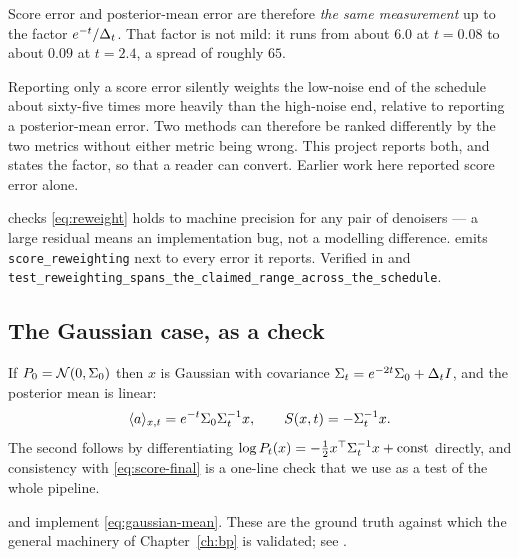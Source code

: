 Score error and posterior-mean error are therefore \emph{the same measurement} up to the
factor $e^{-t}/\Delta_t$. That factor is not mild: it runs from about $6.0$ at $t=0.08$ to about
$0.09$ at $t=2.4$, a spread of roughly $65$.

\begin{pitfall}
Reporting only a score error silently weights the low-noise end of the schedule about
sixty-five times more heavily than the high-noise end, relative to reporting a posterior-mean
error. Two methods can therefore be ranked differently by the two metrics without either
metric being wrong. This project reports both, and states the factor, so that a reader can
convert. Earlier work here reported score error alone.
\begin{codebox}
 checks \eqref{eq:reweight} holds to
machine precision for any pair of denoisers --- a large residual means an implementation bug,
not a modelling difference.  emits
\texttt{score\_reweighting} next to every error it reports.
Verified in 
and \texttt{test\_reweighting\_spans\_the\_claimed\_range\_across\_the\_schedule}.
\end{codebox}
\end{pitfall}

\subsection{The Gaussian case, as a check}

If $P_0 = \mathcal{N}\!\left(0,\Sigma_0\right)$ then $x$ is Gaussian with covariance
$\Sigma_t = e^{-2t}\Sigma_0 + \Delta_t I$, and the posterior mean is linear:
\begin{equation}
\label{eq:gaussian-mean}
\langle a \rangle_{x,t} = e^{-t}\Sigma_0 \Sigma_t^{-1} x ,
\qquad
S(x,t) = -\Sigma_t^{-1}x .
\end{equation}
The second follows by differentiating $\log P_t(x) = -\tfrac12 x^\top\Sigma_t^{-1}x + \text{const}$
directly, and consistency with \eqref{eq:score-final} is a one-line check that we use as a
test of the whole pipeline.

\begin{codebox}
 and
 implement \eqref{eq:gaussian-mean}.
These are the ground truth against which the general machinery of Chapter~\ref{ch:bp} is
validated; see .
\end{codebox}

